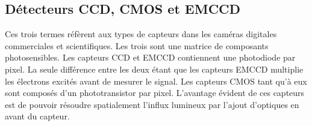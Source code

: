 \documentclass[12pt,oneside,letterpaper]{article}
\begin{document}
\subsection{Détecteurs CCD, CMOS et EMCCD}
Ces trois termes réfèrent aux types de capteurs dans les caméras digitales commerciales et scientifiques. Les trois sont une matrice de composants photosensibles. Les capteurs CCD et EMCCD contiennent une photodiode par pixel. La seule différence entre les deux étant que les capteurs EMCCD multiplie les électrons excités avant de mesurer le signal. Les capteurs CMOS tant qu'à eux sont composés d'un phototransistor par pixel. L'avantage évident de ces capteurs est de pouvoir résoudre spatialement l'influx lumineux par l'ajout d'optiques en avant du capteur.
\end{document}
